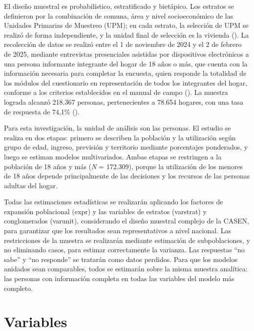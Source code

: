 \documentclass[
  spanish,
  a4paper,
  oneside]{scrbook}
\begin{document}
El diseño muestral es probabilístico, estratificado y bietápico. Los
estratos se definieron por la combinación de comuna, área y nivel
socioeconómico de las Unidades Primarias de Muestreo (UPM); en cada
estrato, la selección de UPM se realizó de forma independiente, y la
unidad final de selección es la vivienda
(). La recolección de datos se realizó entre el 1 de
noviembre de 2024 y el 2 de febrero de 2025, mediante entrevistas
presenciales asistidas por dispositivos electrónicos a una persona
informante integrante del hogar de 18 años o más, que cuenta con la
información necesaria para completar la encuesta, quien responde la
totalidad de los módulos del cuestionario en representación de todos los
integrantes del hogar, conforme a los criterios establecidos en el
manual de campo (). La muestra lograda
alcanzó 218.367 personas, pertenecientes a 78.654 hogares, con una tasa
de respuesta de 74,1\% ().

Para esta investigación, la unidad de análisis son las personas. El
estudio se realiza en dos etapas: primero se describen la población y la
utilización según grupo de edad, ingreso, previsión y territorio
mediante porcentajes ponderados, y luego se estiman modelos
multivariados. Ambas etapas se restringen a la población de 18 años y
más (\emph{N} = 172.309), porque la utilización de los menores de 18
años depende principalmente de las decisiones y los recursos de las
personas adultas del hogar.

Todas las estimaciones estadísticas se realizarán aplicando los factores
de expansión poblacional (expr) y las variables de estratos (varstrat) y
conglomerados (varunit), considerando el diseño muestral complejo de la
CASEN, para garantizar que los resultados sean representativos a nivel
nacional. Las restricciones de la muestra se realizarán mediante
estimación de subpoblaciones, y no eliminando casos, para estimar
correctamente la varianza. Las respuestas ``no sabe'' y ``no responde''
se tratarán como datos perdidos. Para que los modelos anidados sean
comparables, todos se estimarán sobre la misma muestra analítica: las
personas con información completa en todas las variables del modelo más
completo.

\section{Variables}\label{variables}
\end{document}
